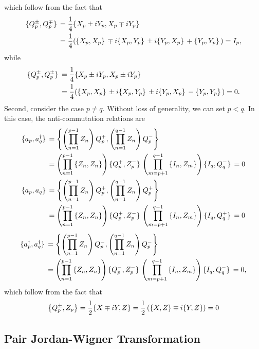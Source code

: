 \documentclass[10pt]{article}
\begin{document}
which follow from the fact that
\begin{align}
\acomm*{Q^{\pm}_p}{Q^{\mp}_p}
&=
\frac{1}{4}\acomm*{X_p \pm iY_p}{X_p \mp iY_p}
\nonumber
\\
&=
\frac{1}{4}(\acomm*{X_p}{X_p} \mp i\acomm*{X_p}{Y_p} \pm i\acomm*{Y_p}{X_p}+\acomm*{Y_p}{Y_p})
=I_p
,\end{align}
while
\begin{align}
\acomm*{Q^{\pm}_p}{Q^{\pm}_p}
&=
\frac{1}{4}\acomm*{X_p \pm iY_p}{X_p \pm iY_p}
\nonumber
\\
&=
\frac{1}{4}(\acomm*{X_p}{X_p} \pm i\acomm*{X_p}{Y_p} \pm i\acomm*{Y_p}{X_p}-\acomm*{Y_p}{Y_p})
=0
.\end{align}
Second, consider the case $p\neq q$. Without loss of generality, we can set $p<q$. In this case, the anti-commutation relations are
\begin{align}
\acomm*{a_p}{a^\dagger_q}
&=
\acomm{\left(\prod_{n=1}^{p-1}Z_n\right)Q^+_p}{\left(\prod_{n=1}^{q-1}Z_n\right)Q^-_p}
\\
&=
\left(\prod_{n=1}^{p-1}\acomm{Z_n}{Z_n}\right)
\acomm*{Q^+_p}{Z^-_p}
\left(\prod_{m=p+1}^{q-1}\acomm{I_n}{Z_m}\right)
\acomm*{I_q}{Q^-_q}
=
0
\\
\acomm*{a_p}{a_q}
&=
\acomm{\left(\prod_{n=1}^{p-1}Z_n\right)Q^+_p}{\left(\prod_{n=1}^{q-1}Z_n\right)Q^+_p}
\\
&=
\left(\prod_{n=1}^{p-1}\acomm{Z_n}{Z_n}\right)
\acomm*{Q^+_p}{Z^-_p}
\left(\prod_{m=p+1}^{q-1}\acomm{I_n}{Z_m}\right)
\acomm*{I_q}{Q^+_q}
=
0
\end{align}
\begin{align}
\acomm*{a^\dagger_p}{a^\dagger_q}
&=
\acomm{\left(\prod_{n=1}^{p-1}Z_n\right)Q^-_p}{\left(\prod_{n=1}^{q-1}Z_n\right)Q^-_p}
\\
&=
\left(\prod_{n=1}^{p-1}\acomm{Z_n}{Z_n}\right)
\acomm*{Q^-_p}{Z^-_p}
\left(\prod_{m=p+1}^{q-1}\acomm{I_n}{Z_m}\right)
\acomm*{I_q}{Q^-_q}
=
0
,\end{align}
which follow from the fact that
\begin{align}
\acomm{Q^{\pm}_p}{Z_p}=\frac{1}{2}\acomm{X \mp iY}{Z}
=\frac{1}{2}\left(\acomm{X}{Z}\mp i\acomm{Y}{Z}\right)=0
\end{align}

\subsection{Pair Jordan-Wigner Transformation}
\end{document}

